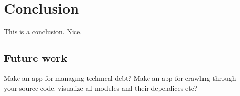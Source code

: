 \chapter{Conclusion}
This is a conclusion. Nice.

\section{Future work}
Make an app for managing technical debt? Make an app for crawling through your source code, visualize all modules and their dependices etc?